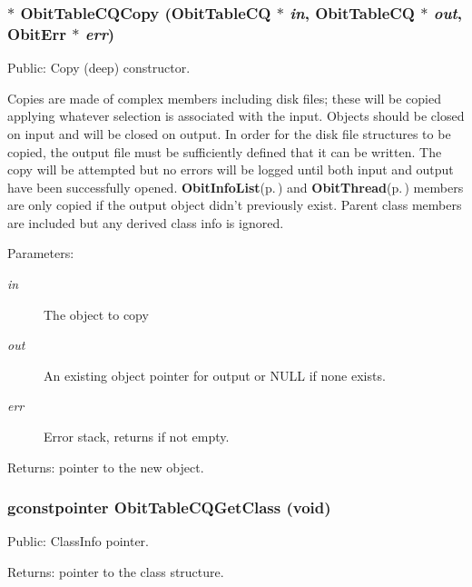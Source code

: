 \subsubsection{$\ast$ Obit\-Table\-CQCopy ({\bf Obit\-Table\-CQ} $\ast$ {\em in}, {\bf Obit\-Table\-CQ} $\ast$ {\em out}, {\bf Obit\-Err} $\ast$ {\em err})}\label{ObitTableCQ_8c_a20}


Public: Copy (deep) constructor. 

Copies are made of complex members including disk files; these will be copied applying whatever selection is associated with the input. Objects should be closed on input and will be closed on output. In order for the disk file structures to be copied, the output file must be sufficiently defined that it can be written. The copy will be attempted but no errors will be logged until both input and output have been successfully opened. {\bf Obit\-Info\-List}{\rm (p.\,\pageref{structObitInfoList})} and {\bf Obit\-Thread}{\rm (p.\,\pageref{structObitThread})} members are only copied if the output object didn't previously exist. Parent class members are included but any derived class info is ignored. \begin{Desc}
\item[Parameters:]
\begin{description}
\item[{\em in}]The object to copy \item[{\em out}]An existing object pointer for output or NULL if none exists. \item[{\em err}]Error stack, returns if not empty. \end{description}
\end{Desc}
\begin{Desc}
\item[Returns:]pointer to the new object. \end{Desc}
\subsubsection{\setlength{\rightskip}{0pt plus 5cm}gconstpointer Obit\-Table\-CQGet\-Class (void)}\label{ObitTableCQ_8c_a17}


Public: Class\-Info pointer. 

\begin{Desc}
\item[Returns:]pointer to the class structure. \end{Desc}
